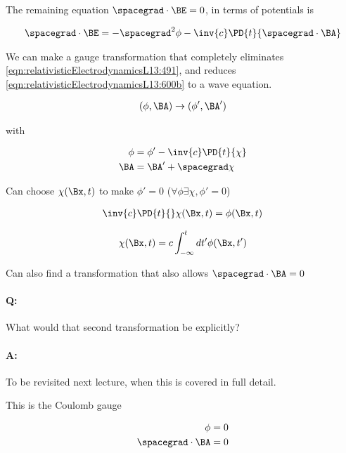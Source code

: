 The remaining equation $\spacegrad \cdot \BE = 0$, in terms of potentials is

\begin{align}\label{eqn:relativisticElectrodynamicsL13:491}
\spacegrad \cdot \BE = - \spacegrad^2 \phi - \inv{c} \PD{t}{\spacegrad \cdot \BA} 
\end{align}

We can make a gauge transformation that completely eliminates \ref{eqn:relativisticElectrodynamicsL13:491}, and reduces \ref{eqn:relativisticElectrodynamicsL13:600b} to a wave equation.

\begin{align}\label{eqn:relativisticElectrodynamicsL13:490}
(\phi, \BA) \rightarrow (\phi', \BA')
\end{align}

with

\begin{align}\label{eqn:relativisticElectrodynamicsL13:510}
\phi &= \phi' - \inv{c} \PD{t}{\chi} \\
\BA &= \BA' + \spacegrad \chi
\end{align}

Can choose $\chi(\Bx, t)$ to make $\phi' = 0$ ($\forall \phi \exists \chi, \phi' = 0$)

\begin{align}\label{eqn:relativisticElectrodynamicsL13:530}
\inv{c} \PD{t}{} \chi(\Bx, t) = \phi(\Bx, t)
\end{align}

\begin{align}\label{eqn:relativisticElectrodynamicsL13:550}
\chi(\Bx, t) = c \int_{-\infty}^t dt' \phi(\Bx, t')
\end{align}

Can also find a transformation that also allows $\spacegrad \cdot \BA = 0$

\paragraph{Q:} What would that second transformation be explicitly? 
\paragraph{A:} To be revisited next lecture, when this is covered in full detail.

This is the Coulomb gauge

\begin{align}\label{eqn:relativisticElectrodynamicsL13:570}
\phi &= 0 \\
\spacegrad \cdot \BA &= 0
\end{align}

